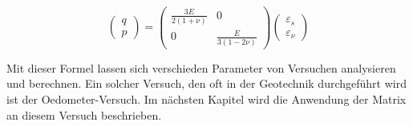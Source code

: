 \[
\begin{pmatrix}
	q\\
	p
\end{pmatrix}
=
\begin{pmatrix}
	\frac{3E}{2(1+\nu)} &                   0 \\
	                  0 & \frac{E}{3(1-2\nu)}
\end{pmatrix}
\begin{pmatrix}
	\varepsilon_{s}\\
	\varepsilon_{\nu}
\end{pmatrix}
\]

Mit dieser Formel lassen sich verschieden Parameter von Versuchen analysieren und berechnen.
Ein solcher Versuch, den oft in der Geotechnik durchgeführt wird ist der Oedometer-Versuch.
Im nächsten Kapitel wird die Anwendung der Matrix an diesem Versuch beschrieben.
